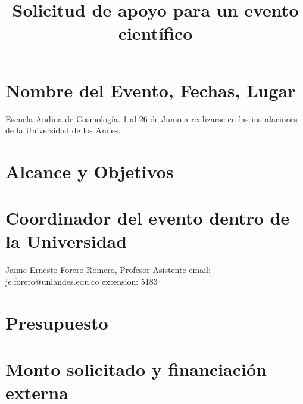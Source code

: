 \documentclass{report}
\title{Solicitud de apoyo para un evento cient\'ifico}
\begin{document}
\section{Nombre del Evento, Fechas, Lugar}

Escuela Andina de Cosmolog\'ia. 1 al 26 de Junio a realizarse en las
instalaciones de la Universidad de los Andes. 

\section{Alcance y Objetivos}

\section{Coordinador del evento dentro de la Universidad}
Jaime Ernesto Forero-Romero, Profesor Asistente email: je.forero@uniandes.edu.co
extension: 5183

\section{Presupuesto}

\section{Monto solicitado y financiaci\'on externa}
\end{document}
